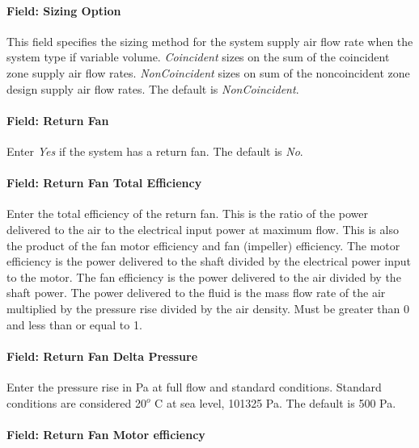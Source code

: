 \paragraph{Field: Sizing Option}\label{field-sizing-option-3}

This field specifies the sizing method for the system supply air flow rate when the system type if variable volume. \emph{Coincident} sizes on the sum of the coincident zone supply air flow rates. \emph{NonCoincident} sizes on sum of the noncoincident zone design supply air flow rates. The default is \emph{NonCoincident}.

\paragraph{Field: Return Fan}\label{field-return-fan-4}

Enter \emph{Yes} if the system has a return fan. The default is \emph{No}.

\paragraph{Field: Return Fan Total Efficiency}\label{field-return-fan-total-efficiency-4}

Enter the total efficiency of the return fan. This is the ratio of the power delivered to the air to the electrical input power at maximum flow. This is also the product of the fan motor efficiency and fan (impeller) efficiency. The motor efficiency is the power delivered to the shaft divided by the electrical power input to the motor. The fan efficiency is the power delivered to the air divided by the shaft power. The power delivered to the fluid is the mass flow rate of the air multiplied by the pressure rise divided by the air density. Must be greater than 0 and less than or equal to 1.

\paragraph{Field: Return Fan Delta Pressure}\label{field-return-fan-delta-pressure-6}

Enter the pressure rise in Pa at full flow and standard conditions. Standard conditions are considered 20\(^{o}\) C at sea level, 101325 Pa. The default is 500 Pa.

\paragraph{Field: Return Fan Motor efficiency}\label{field-return-fan-motor-efficiency-6}


